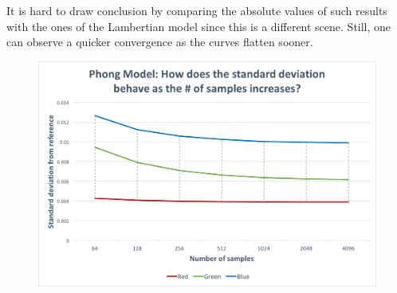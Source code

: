 \documentclass{article}
\begin{document}
It is hard to draw conclusion by comparing the absolute values of such results with the ones of the Lambertian model since this is a different scene. Still, one can observe a quicker convergence as the curves flatten sooner.
\begin{figure}[p]
\centering
\includegraphics[width=\textwidth]{assets/phong_stdev}
\\

\label{fig:phong_stdev}
\end{figure}
\end{document}
